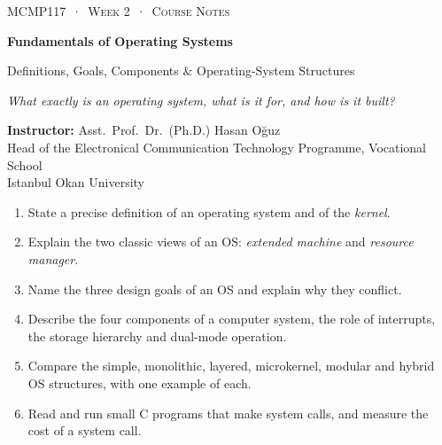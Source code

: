 \documentclass[11pt,a4paper]{article}
\begin{document}
\thispagestyle{empty}
\begin{tcolorbox}[enhanced,colback=dark,colframe=dark,arc=0pt,boxrule=0pt,
  left=18pt,right=18pt,top=20pt,bottom=20pt,coltext=white]
{\small\color{mint}\textsc{MCMP117 \,·\, Week 2 \,·\, Course Notes}}\par\medskip
{\headfont\fontsize{26}{30}\selectfont\bfseries Fundamentals of Operating Systems}\par\medskip
{\large Definitions, Goals, Components \& Operating-System Structures}\par\smallskip
{\small\itshape\color{white!70} What exactly is an operating system, what is it for, and how is it built?}
\end{tcolorbox}

\vspace{0.4em}
{\small
\textbf{Instructor:} Asst.\ Prof.\ Dr.\ (Ph.D.) Hasan Oğuz\\
Head of the Electronical Communication Technology Programme, Vocational School\\
Istanbul Okan University\par}

\vspace{0.8em}
\begin{keyidea}
\begin{enumerate}[leftmargin=1.4em]
  \item State a precise definition of an operating system and of the \emph{kernel}.
  \item Explain the two classic views of an OS: \emph{extended machine} and \emph{resource manager}.
  \item Name the three design goals of an OS and explain why they conflict.
  \item Describe the four components of a computer system, the role of interrupts, the storage hierarchy and dual-mode operation.
  \item Compare the simple, monolithic, layered, microkernel, modular and hybrid OS structures, with one example of each.
  \item Read and run small C programs that make system calls, and measure the cost of a system call.
\end{enumerate}
\end{keyidea}

\setcounter{tocdepth}{2}
\tableofcontents

\end{document}
